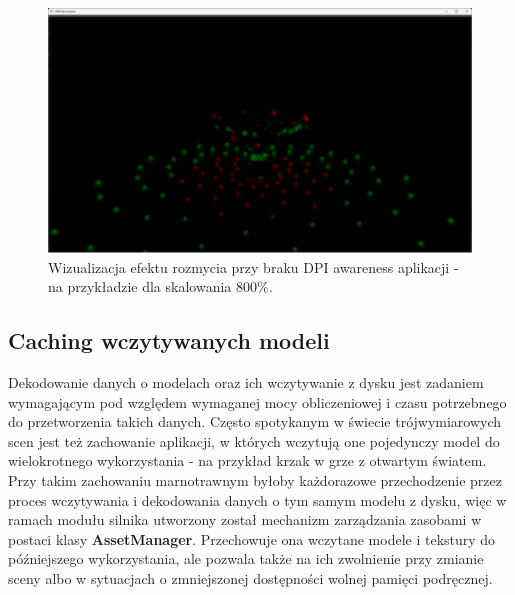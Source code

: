 \begin{figure}[h!]
	\centering
	\includegraphics[width=\textwidth]{images/impl/4_dpi_awareness_8x.png}
	\caption{Wizualizacja efektu rozmycia przy braku DPI awareness aplikacji - na przykładzie dla skalowania 800\%.}
	\label{Impl_DpiAwareness}
\end{figure}

\vfill

\subsection{Caching wczytywanych modeli}
Dekodowanie danych o modelach oraz ich wczytywanie z dysku jest zadaniem wymagającym pod względem wymaganej mocy obliczeniowej i czasu potrzebnego do przetworzenia takich danych. Często spotykanym w świecie trójwymiarowych scen jest też zachowanie aplikacji, w których wczytują one pojedynczy model do wielokrotnego wykorzystania - na przykład krzak w grze z otwartym światem. Przy takim zachowaniu marnotrawnym byłoby każdorazowe przechodzenie przez proces wczytywania i dekodowania danych o tym samym modelu z dysku, więc w ramach modułu silnika utworzony został mechanizm zarządzania zasobami w postaci klasy \textbf{AssetManager}. Przechowuje ona wczytane modele i tekstury do późniejszego wykorzystania, ale pozwala także na ich zwolnienie przy zmianie sceny albo w sytuacjach o zmniejszonej dostępności wolnej pamięci podręcznej. 

